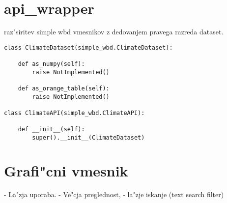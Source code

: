\section{api\_wrapper}



raz"siritev simple wbd vmesnikov z dedovanjem pravega razreda dataset.

\begin{verbatim}
class ClimateDataset(simple_wbd.ClimateDataset):
    
    def as_numpy(self):
        raise NotImplemented()
    
    def as_orange_table(self):
        raise NotImplemented()

class ClimateAPI(simple_wbd.ClimateAPI):

    def __init__(self):
        super().__init__(ClimateDataset)
\end{verbatim}





\section{Grafi"cni vmesnik}


- La"zja uporaba.
- Ve"cja preglednost,
- la"zje iskanje (text search filter)
